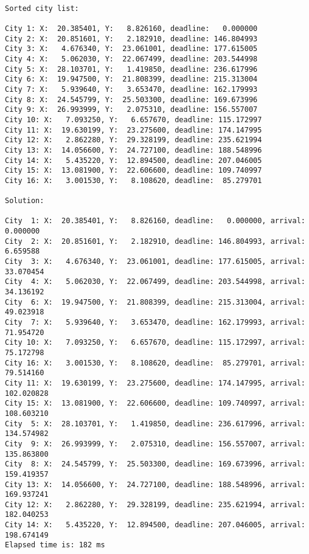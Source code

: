 \documentclass[a4paper, 12pt]{article}
\begin{document}
\begin{lstlisting}

Sorted city list:

City 1: X:  20.385401, Y:   8.826160, deadline:   0.000000
City 2: X:  20.851601, Y:   2.182910, deadline: 146.804993
City 3: X:   4.676340, Y:  23.061001, deadline: 177.615005
City 4: X:   5.062030, Y:  22.067499, deadline: 203.544998
City 5: X:  28.103701, Y:   1.419850, deadline: 236.617996
City 6: X:  19.947500, Y:  21.808399, deadline: 215.313004
City 7: X:   5.939640, Y:   3.653470, deadline: 162.179993
City 8: X:  24.545799, Y:  25.503300, deadline: 169.673996
City 9: X:  26.993999, Y:   2.075310, deadline: 156.557007
City 10: X:   7.093250, Y:   6.657670, deadline: 115.172997
City 11: X:  19.630199, Y:  23.275600, deadline: 174.147995
City 12: X:   2.862280, Y:  29.328199, deadline: 235.621994
City 13: X:  14.056600, Y:  24.727100, deadline: 188.548996
City 14: X:   5.435220, Y:  12.894500, deadline: 207.046005
City 15: X:  13.081900, Y:  22.606600, deadline: 109.740997
City 16: X:   3.001530, Y:   8.108620, deadline:  85.279701

Solution: 

City  1: X:  20.385401, Y:   8.826160, deadline:   0.000000, arrival:   0.000000
City  2: X:  20.851601, Y:   2.182910, deadline: 146.804993, arrival:   6.659588
City  3: X:   4.676340, Y:  23.061001, deadline: 177.615005, arrival:  33.070454
City  4: X:   5.062030, Y:  22.067499, deadline: 203.544998, arrival:  34.136192
City  6: X:  19.947500, Y:  21.808399, deadline: 215.313004, arrival:  49.023918
City  7: X:   5.939640, Y:   3.653470, deadline: 162.179993, arrival:  71.954720
City 10: X:   7.093250, Y:   6.657670, deadline: 115.172997, arrival:  75.172798
City 16: X:   3.001530, Y:   8.108620, deadline:  85.279701, arrival:  79.514160
City 11: X:  19.630199, Y:  23.275600, deadline: 174.147995, arrival: 102.020828
City 15: X:  13.081900, Y:  22.606600, deadline: 109.740997, arrival: 108.603210
City  5: X:  28.103701, Y:   1.419850, deadline: 236.617996, arrival: 134.574982
City  9: X:  26.993999, Y:   2.075310, deadline: 156.557007, arrival: 135.863800
City  8: X:  24.545799, Y:  25.503300, deadline: 169.673996, arrival: 159.419357
City 13: X:  14.056600, Y:  24.727100, deadline: 188.548996, arrival: 169.937241
City 12: X:   2.862280, Y:  29.328199, deadline: 235.621994, arrival: 182.040253
City 14: X:   5.435220, Y:  12.894500, deadline: 207.046005, arrival: 198.674149
Elapsed time is: 182 ms

\end{lstlisting}
\end{document}
